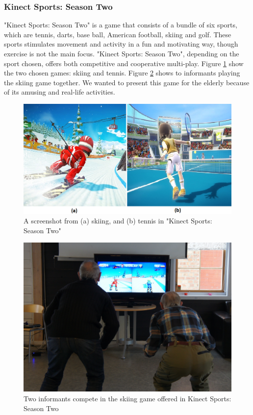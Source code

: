\subsubsection{Kinect Sports: Season Two}
"Kinect Sports: Season Two" is a game that consists of a bundle of six sports, which are tennis, darts, base ball, American football, skiing and golf. These sports stimulates movement and activity in a fun and motivating way, though exercise is not the main focus. "Kinect Sports: Season Two", depending on the sport chosen, offers both competitive and cooperative multi-play. Figure \ref{fig:sportsgame} show the two chosen games: skiing and tennis. Figure \ref{fig:elderlyskii} shows to informants playing the skiing game together. We wanted to present this game for the elderly because of its amusing and real-life activities. 

\begin{figure} [H]
\centering
\includegraphics[scale=0.4]{skiitennis}
\caption[Kinect Sports Season Two, Skiing and Tennis]{A screenshot from (a) skiing, and (b) tennis in "Kinect Sports: Season Two" \cite{sportsgame}}
\label{fig:sportsgame}
\end{figure}

\begin{figure}
\centering
\includegraphics[scale=0.5]{eldreSpiller.jpg}
\caption[Kinect Sports Season Two, Multi-play]{Two informants compete in the skiing game offered in Kinect Sports: Season Two}
\label{fig:elderlyskii}
\end{figure}

